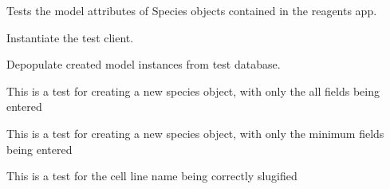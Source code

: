 \documentclass[letterpaper,10pt,english]{sphinxmanual}
\begin{document}

\begin{fulllineitems}
\label{api:experimentdb.reagents.tests.SpeciesModelTests}
Tests the model attributes of Species objects contained in the reagents app.

\begin{fulllineitems}
\label{api:experimentdb.reagents.tests.SpeciesModelTests.setUp}
Instantiate the test client.

\end{fulllineitems}


\begin{fulllineitems}
\label{api:experimentdb.reagents.tests.SpeciesModelTests.tearDown}
Depopulate created model instances from test database.

\end{fulllineitems}


\begin{fulllineitems}
\label{api:experimentdb.reagents.tests.SpeciesModelTests.test_create_species_all_fields}
This is a test for creating a new species object, with only the all fields being entered

\end{fulllineitems}


\begin{fulllineitems}
\label{api:experimentdb.reagents.tests.SpeciesModelTests.test_create_species_minimal}
This is a test for creating a new species object, with only the minimum fields being entered

\end{fulllineitems}


\begin{fulllineitems}
\label{api:experimentdb.reagents.tests.SpeciesModelTests.test_species_slugify}
This is a test for the cell line name being correctly slugified

\end{fulllineitems}


\end{fulllineitems}
\end{document}
